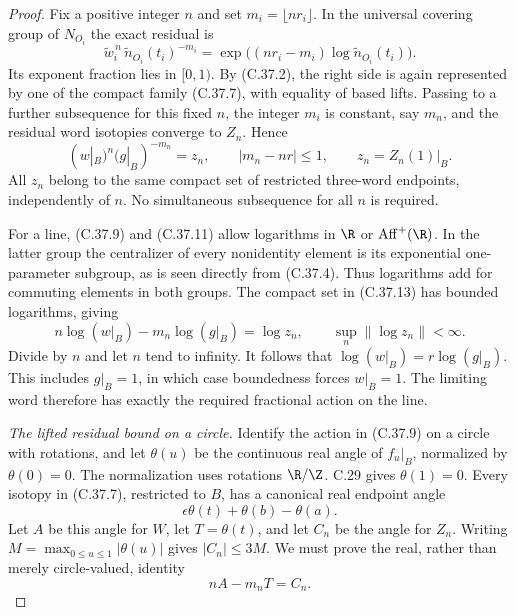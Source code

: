 \begin{proof}
Fix a positive integer $n$ and set $m_i=\lfloor nr_i\rfloor$.
In the universal covering group of $N_{O_i}$ the exact
residual is
\[
 \widetilde w_i^{\,n}\,
       \widetilde n_{O_i}(t_i)^{-m_i}
    =\exp\bigl((nr_i-m_i)
                  \log\widetilde n_{O_i}(t_i)\bigr).
                                                        \tag{C.37.12}
\]
Its exponent fraction lies in $[0,1)$.
By (C.37.2), the right side is again represented by one of
the compact family (C.37.7), with equality of based lifts.
Passing to a further subsequence for this fixed $n$,
the integer $m_i$ is constant, say $m_n$, and the residual
word isotopies converge to $Z_n$. Hence
\[
 (w|_B)^n(g|_B)^{-m_n}=z_n,\qquad
 |m_n-nr|\leq1,\qquad z_n=Z_n(1)|_B.                    \tag{C.37.13}
\]
All $z_n$ belong to the same compact set of restricted
three-word endpoints, independently of $n$.
No simultaneous subsequence for all $n$ is required.

For a line, (C.37.9) and (C.37.11) allow logarithms in
$\R$ or $\operatorname{Aff}^+(\R)$.
In the latter group the centralizer of every nonidentity
element is its exponential one-parameter subgroup, as is
seen directly from (C.37.4). Thus logarithms add for
commuting elements in both groups. The compact set in
(C.37.13) has bounded logarithms, giving
\[
 n\log(w|_B)-m_n\log(g|_B)=\log z_n,\qquad
 \sup_n\|\log z_n\|<\infty.
                                                        \tag{C.37.14}
\]
Divide by $n$ and let $n$ tend to infinity.
It follows that $\log(w|_B)=r\log(g|_B)$.
This includes $g|_B=1$, in which case boundedness forces
$w|_B=1$. The limiting word therefore has exactly the
required fractional action on the line.

\emph{The lifted residual bound on a circle.}
Identify the action in (C.37.9) on a circle with rotations,
and let $\theta(u)$ be the continuous real angle of
$f_u|_B$, normalized by $\theta(0)=0$.
The normalization uses rotations $\R/\Z$.
C.29 gives $\theta(1)=0$.
Every isotopy in (C.37.7), restricted to $B$, has a
canonical real endpoint angle
\[
 \epsilon\theta(t)+\theta(b)-\theta(a).
                                                        \tag{C.37.15}
\]
Let $A$ be this angle for $W$, let $T=\theta(t)$,
and let $C_n$ be the angle for $Z_n$.
Writing $M=\max_{0\leq u\leq1}|\theta(u)|$ gives
$|C_n|\leq3M$.
We must prove the real, rather than merely circle-valued,
identity
\[
                     nA-m_nT=C_n.                      \tag{C.37.16}
\]


\end{proof}
